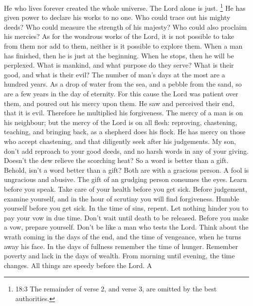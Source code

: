  He who lives forever created the whole universe.
 The Lord alone is just.  \footnote{18:3 The
  remainder of verse 2, and verse 3, are omitted by the best
  authorities.}  He has given power to declare his works to
no one. Who could trace out his mighty deeds?  Who could
measure the strength of his majesty? Who could also proclaim his
mercies?  As for the wondrous works of the Lord, it is not
possible to take from them nor add to them, neither is it possible to
explore them.  When a man has finished, then he is just at
the beginning. When he stops, then he will be perplexed. 
What is mankind, and what purpose do they serve? What is their good, and
what is their evil?  The number of man's days at the most
are a hundred years.  As a drop of water from the sea, and
a pebble from the sand, so are a few years in the day of eternity.
 For this cause the Lord was patient over them, and poured
out his mercy upon them.  He saw and perceived their end,
that it is evil. Therefore he multiplied his forgiveness. 
The mercy of a man is on his neighbour; but the mercy of the Lord is on
all flesh: reproving, chastening, teaching, and bringing back, as a
shepherd does his flock.  He has mercy on those who accept
chastening, and that diligently seek after his judgements. 
My son, don't add reproach to your good deeds, and no harsh words in any
of your giving.  Doesn't the dew relieve the scorching
heat? So a word is better than a gift.  Behold, isn't a
word better than a gift? Both are with a gracious person. 
A fool is ungracious and abusive. The gift of an grudging person
consumes the eyes.  Learn before you speak. Take care of
your health before you get sick.  Before judgement, examine
yourself, and in the hour of scrutiny you will find forgiveness.
 Humble yourself before you get sick. In the time of sins,
repent.  Let nothing hinder you to pay your vow in due
time. Don't wait until death to be released.  Before you
make a vow, prepare yourself. Don't be like a man who tests the Lord.
 Think about the wrath coming in the days of the end, and
the time of vengeance, when he turns away his face.  In the
days of fullness remember the time of hunger. Remember poverty and lack
in the days of wealth.  From morning until evening, the
time changes. All things are speedy before the Lord.  A
